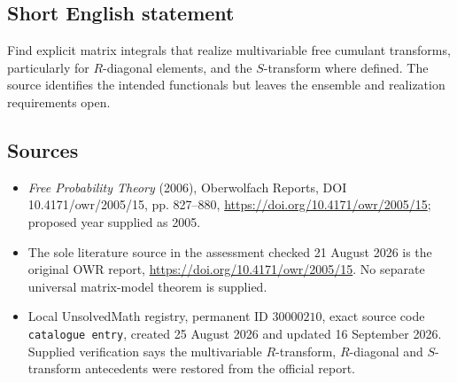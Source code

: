 \documentclass[11pt]{article}
\begin{document}
\subsection{Short English statement}
Find explicit matrix integrals that realize multivariable free cumulant transforms, particularly for $R$-diagonal elements, and the $S$-transform where defined. The source identifies the intended functionals but leaves the ensemble and realization requirements open.
\subsection{Sources}
\begin{itemize}
\item \emph{Free Probability Theory} (2006), Oberwolfach Reports, DOI 10.4171/owr/2005/15, pp. 827--880, \url{https://doi.org/10.4171/owr/2005/15}; proposed year supplied as 2005.
\item The sole literature source in the assessment checked 21 August 2026 is the original OWR report, \url{https://doi.org/10.4171/owr/2005/15}. No separate universal matrix-model theorem is supplied.
\item Local UnsolvedMath registry, permanent ID $30000210$, exact source code \texttt{catalogue entry}, created 25 August 2026 and updated 16 September 2026. Supplied verification says the multivariable $R$-transform, $R$-diagonal and $S$-transform antecedents were restored from the official report.
\end{itemize}
\end{document}
